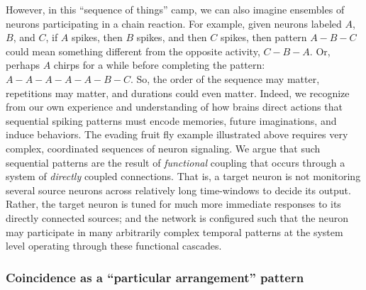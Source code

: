 However, in this ``sequence of things'' camp, we can also imagine ensembles of neurons participating in a chain reaction. 
For example, given neurons labeled $A$, $B$, and $C$, if $A$ spikes, then $B$ spikes, and then $C$ spikes, then pattern $A-B-C$ could mean something different from the opposite activity, $C-B-A$. 
Or, perhaps $A$ chirps for a while before completing the pattern: $A-A-A-A-A-B-C$. So, the order of the sequence may matter, repetitions may matter, and durations could even matter.
Indeed, we recognize from our own experience and understanding of how brains direct actions that sequential spiking patterns must encode memories, future imaginations, and induce behaviors.
The evading fruit fly example illustrated above requires very complex, coordinated sequences of neuron signaling.
We argue that such sequential patterns are the result of \emph{functional} coupling that occurs through a system of \emph{directly} coupled connections.
That is, a target neuron is not monitoring several source neurons across relatively long time-windows to decide its output.
Rather, the target neuron is tuned for much more immediate responses to its directly connected sources; and the network is configured such that the neuron may participate in many arbitrarily complex temporal patterns at the system level operating through these functional cascades.


\subsubsection{Coincidence as a ``particular arrangement'' pattern}

